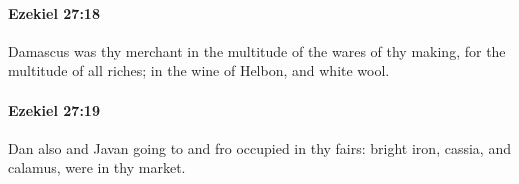 		\paragraph{Ezekiel 27:18} %
			\label{EZEKIEL-27-18}

			Damascus was thy merchant in the multitude of the wares of thy making, for the multitude of all riches; in the wine of Helbon, and white wool.


		\paragraph{Ezekiel 27:19} %
			\label{EZEKIEL-27-19}

			Dan also and Javan going to and fro occupied in thy fairs: bright iron, cassia, and calamus, were in thy market.



